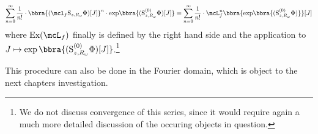 \[
    \sum_{n=0}^\infty\frac{1}{n!}\cdot\bbra{(\mcl_f\text{S}_{z,R_\omega}\Phi)[J]}^n\cdot{\exp}\bbra{(\text{S}_{z,R_\omega}^{(0)}\Phi)[J]} = \sum_{n=0}^\infty\frac{1}{n!}\cdot\mcL_f^n\bbra{{\exp}\bbra{(\text{S}_{z,R_\omega}^{(0)}\Phi)}}[J]
\]
where $\text{Ex}(\mcL_f)$ finally is defined by the right hand side and the application to $J\mapsto \exp\bbra{(\text{S}_{z,R_\omega}^{(0)}\Phi)[J]}$.\footnote{We do not discuss convergence of this series, since it would require again a much more detailed discussion of the occuring objects in question.}

This procedure can also be done in the Fourier domain, which is object to the next chapters investigation. 


